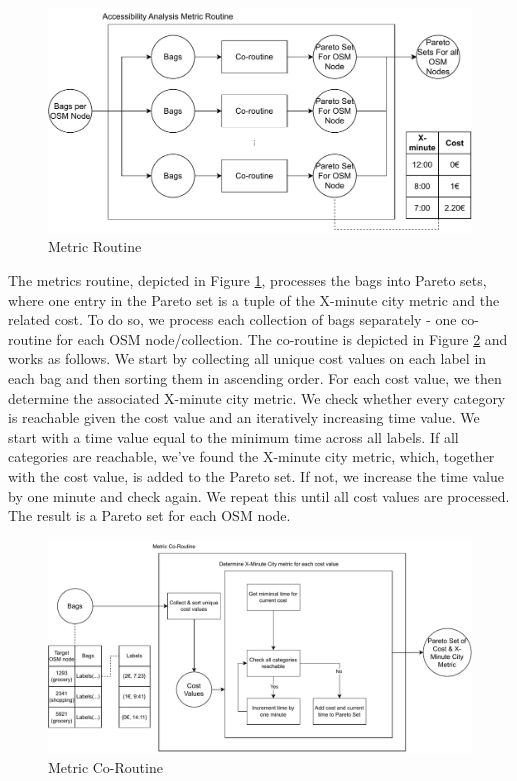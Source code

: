 \begin{figure}
    \centering
    \includegraphics[scale=0.50]{Figures/method/metric_routine}
    \caption{Metric Routine}
    \label{fig:metric_routine}
\end{figure}
The metrics routine, depicted in Figure \ref{fig:metric_routine}, processes the bags into Pareto sets, where one entry in the Pareto set is a tuple of the X-minute city metric and the related cost.
To do so, we process each collection of bags separately - one co-routine for each OSM node/collection.
The co-routine is depicted in Figure \ref{fig:metric_co_routine} and works as follows.
We start by collecting all unique cost values on each label in each bag and then sorting them in ascending order.
For each cost value, we then determine the associated X-minute city metric.
We check whether every category is reachable given the cost value and an iteratively increasing time value.
We start with a time value equal to the minimum time across all labels.
If all categories are reachable, we've found the X-minute city metric, which, together with the cost value, is added to the Pareto set.
If not, we increase the time value by one minute and check again.
We repeat this until all cost values are processed.
The result is a Pareto set for each OSM node.

\begin{figure}
    \centering
    \includegraphics[scale=0.60]{Figures/method/metric_coroutine}
    \caption{Metric Co-Routine}
    \label{fig:metric_co_routine}
\end{figure}
